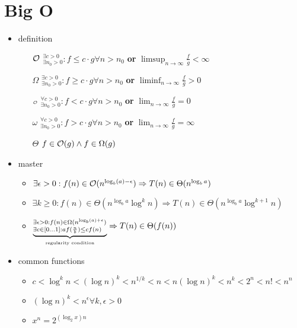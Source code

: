 \documentclass{article}
\begin{document}
\section{Big O}
\begin{itemize}
  \item definition
        \begin{itemize}
          \item[$\mathcal{O}$] $^{\exists c > 0}_{\exists n_0 > 0}: f \leq c \cdot g \forall n > n_0$ \textbf{or} $\limsup_{n\to\infty} \frac{f}{g} < \infty$
          \item[$\Omega$] $^{\exists c > 0}_{\exists n_0 > 0}: f \geq c \cdot g \forall n > n_0$ \textbf{or} $\liminf_{n\to\infty} \frac{f}{g} > 0$
          \item[${\scriptscriptstyle\mathcal{O}}$] $^{\forall c > 0}_{\exists n_0 > 0}: f < c \cdot g \forall n > n_0$ \textbf{or} $\lim_{n\to\infty} \frac{f}{g} = 0$
          \item[$\omega$] $^{\forall c > 0}_{\exists n_0 > 0}: f > c \cdot g \forall n > n_0$ \textbf{or} $\lim_{n\to\infty} \frac{f}{g} = \infty$
          \item[$\Theta$] $f\in \mathcal{O}(g) \land f\in \Omega(g)$
        \end{itemize}
  \item master
        \begin{itemize}
          \item $\exists \epsilon > 0: f(n) \in \mathcal{O}(n^{\log_b(a)-\epsilon}) \Rightarrow T(n) \in \Theta(n^{\log_b a})$
          \item $\exists k \ge 0: f(n) \in \Theta(n^{\log_b a}\log^k n) \Rightarrow T(n) \in \Theta(n^{\log_b a} \log^{k+1} n)$
          \item $\underbrace{^{\exists \epsilon > 0: f(n) \in \Omega(n^{\log_b(a)+\epsilon})}_{\exists c \in [0\dots1]: a f(\frac{n}{b}) \leq c f(n)}}_{\text{\tiny regularity condition}} \Rightarrow T(n) \in \Theta(f(n))$
        \end{itemize}
  \item common functions \begin{itemize}
          \item $c<\log^k n<(\log n)^k<n^{1/k}<n<n(\log n)^k<n^k<2^n<n!<n^n$
          \item $(\log n)^k < n^\epsilon \forall k,\epsilon > 0$
          \item $x^n=2^{(\log_2 x)n}$
        \end{itemize}
\end{itemize}
\end{document}
